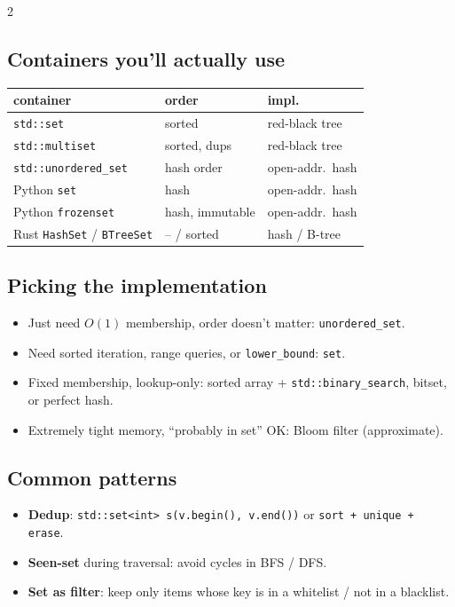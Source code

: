 \documentclass[10pt]{article}
\begin{document}
\begin{multicols}{2}
\subsection*{Containers you'll actually use}
\begin{tabular}{@{}l|l|l@{}}
\textbf{container}               & \textbf{order}  & \textbf{impl.}\\
\hline
\texttt{std::set}                & sorted          & red-black tree\\
\texttt{std::multiset}           & sorted, dups    & red-black tree\\
\texttt{std::unordered\_set}     & hash order      & open-addr.\ hash\\
Python \texttt{set}              & hash            & open-addr.\ hash\\
Python \texttt{frozenset}        & hash, immutable & open-addr.\ hash\\
Rust \texttt{HashSet} / \texttt{BTreeSet} & -- / sorted & hash / B-tree
\end{tabular}

\subsection*{Picking the implementation}
\begin{itemize}
    \item Just need $O(1)$ membership, order doesn't matter:
    \texttt{unordered\_set}.
    \item Need sorted iteration, range queries, or
    \texttt{lower\_bound}: \texttt{set}.
    \item Fixed membership, lookup-only: sorted array +
    \texttt{std::binary\_search}, bitset, or perfect hash.
    \item Extremely tight memory, ``probably in set'' OK:
    Bloom filter (approximate).
\end{itemize}

\subsection*{Common patterns}
\begin{itemize}
    \item \textbf{Dedup}: \texttt{std::set<int> s(v.begin(), v.end())}
    or \texttt{sort + unique + erase}.
    \item \textbf{Seen-set} during traversal: avoid cycles in BFS / DFS.
    \item \textbf{Set as filter}: keep only items whose key is in a
    whitelist / not in a blacklist.
\end{itemize}


\end{multicols}
\end{document}

